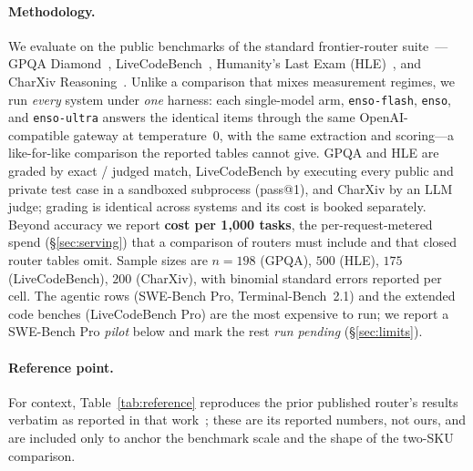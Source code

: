 \documentclass[11pt]{article}
\begin{document}
\paragraph{Methodology.} We evaluate on the public benchmarks of the standard
frontier-router suite~\cite{priororchestrator}---GPQA Diamond~\cite{gpqa},
LiveCodeBench~\cite{livecodebench}, Humanity's Last Exam (HLE)~\cite{hle}, and
CharXiv Reasoning~\cite{charxiv}. Unlike a comparison that mixes measurement
regimes, we run \emph{every} system under \emph{one} harness: each single-model
arm, \texttt{enso-flash}, \texttt{enso}, and \texttt{enso-ultra} answers the
identical items through the same OpenAI-compatible gateway at temperature~0, with
the same extraction and scoring---a like-for-like comparison the reported tables
cannot give. GPQA and HLE are graded by exact / judged match, LiveCodeBench by
executing every public and private test case in a sandboxed subprocess (pass@1),
and CharXiv by an LLM judge; grading is identical across systems and its cost is
booked separately. Beyond accuracy we report \textbf{cost per 1{,}000 tasks}, the
per-request-metered spend (\S\ref{sec:serving}) that a comparison of routers must
include and that closed router tables omit. Sample sizes are $n{=}198$ (GPQA),
$500$ (HLE), $175$ (LiveCodeBench), $200$ (CharXiv), with binomial standard errors
reported per cell. The agentic rows (SWE-Bench Pro, Terminal-Bench~2.1) and the
extended code benches (LiveCodeBench Pro) are the most expensive to run; we report
a SWE-Bench Pro \emph{pilot} below and mark the rest \emph{run pending}
(\S\ref{sec:limits}).

\paragraph{Reference point.} For context, Table~\ref{tab:reference} reproduces
the prior published router's results verbatim as reported in that
work~\cite{priororchestrator}; these are its reported numbers, not ours, and are
included only to anchor the benchmark scale and the shape of the two-SKU
comparison.
\end{document}
